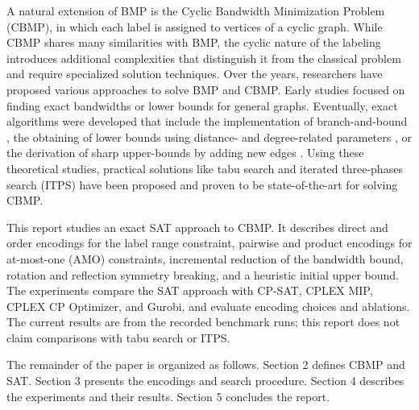 \documentclass[a4paper,fleqn]{cas-sc}
\begin{document}
    A natural extension of BMP is the Cyclic Bandwidth Minimization Problem (CBMP), in which each label is assigned to vertices of a cyclic graph. While CBMP shares many similarities with BMP, the cyclic nature of the labeling introduces additional complexities that distinguish it from the classical problem and require specialized solution techniques. Over the years, researchers have proposed various approaches to solve BMP and CBMP. Early studies focused on finding exact bandwidths or lower bounds for general graphs. Eventually, exact algorithms were developed that include the implementation of branch-and-bound \cite{10.1007/978-3-642-37798-3_13}, the obtaining of lower bounds using distance- and degree-related parameters \cite{ZHOU2000357}, or the derivation of sharp upper-bounds by adding new edges \cite{CHAN2008131}. Using these theoretical studies, practical solutions like tabu search \cite{RODRIGUEZTELLO201517} and iterated three-phases search (ITPS) \cite{REN765302} have been proposed and proven to be state-of-the-art for solving CBMP.

    This report studies an exact SAT approach to CBMP. It describes direct and order encodings for the label range constraint, pairwise and product encodings for at-most-one (AMO) constraints, incremental reduction of the bandwidth bound, rotation and reflection symmetry breaking, and a heuristic initial upper bound. The experiments compare the SAT approach with CP-SAT, CPLEX MIP, CPLEX CP Optimizer, and Gurobi, and evaluate encoding choices and ablations. The current results are from the recorded benchmark runs; this report does not claim comparisons with tabu search or ITPS.

    The remainder of the paper is organized as follows. Section 2 defines CBMP and SAT. Section 3 presents the encodings and search procedure. Section 4 describes the experiments and their results. Section 5 concludes the report.

\end{document}

